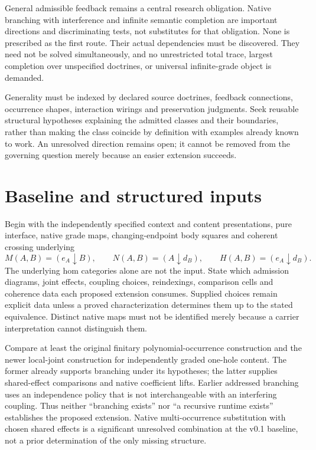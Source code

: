 \documentclass[11pt]{article}
\begin{document}
General admissible feedback remains a central research obligation. Native branching with interference and infinite semantic completion are important directions and discriminating tests, not substitutes for that obligation. None is prescribed as the first route. Their actual dependencies must be discovered. They need not be solved simultaneously, and no unrestricted total trace, largest completion over unspecified doctrines, or universal infinite-grade object is demanded.

Generality must be indexed by declared source doctrines, feedback connections, occurrence shapes, interaction wirings and preservation judgments. Seek reusable structural hypotheses explaining the admitted classes and their boundaries, rather than making the class coincide by definition with examples already known to work. An unresolved direction remains open; it cannot be removed from the governing question merely because an easier extension succeeds.

\section{Baseline and structured inputs}
Begin with the independently specified context and content presentations, pure interface, native grade maps, changing-endpoint body squares and coherent crossing underlying
\[
 M(A,B)=(e_A\downarrow B),\qquad
 N(A,B)=(A\downarrow d_B),\qquad
 H(A,B)=(e_A\downarrow d_B).
\]
The underlying hom categories alone are not the input. State which admission diagrams, joint effects, coupling choices, reindexings, comparison cells and coherence data each proposed extension consumes. Supplied choices remain explicit data unless a proved characterization determines them up to the stated equivalence. Distinct native maps must not be identified merely because a carrier interpretation cannot distinguish them.

Compare at least the original finitary polynomial-occurrence construction and the newer local-joint construction for independently graded one-hole content. The former already supports branching under its hypotheses; the latter supplies shared-effect comparisons and native coefficient lifts. Earlier addressed branching uses an independence policy that is not interchangeable with an interfering coupling. Thus neither ``branching exists'' nor ``a recursive runtime exists'' establishes the proposed extension. Native multi-occurrence substitution with chosen shared effects is a significant unresolved combination at the v0.1 baseline, not a prior determination of the only missing structure.
\end{document}
